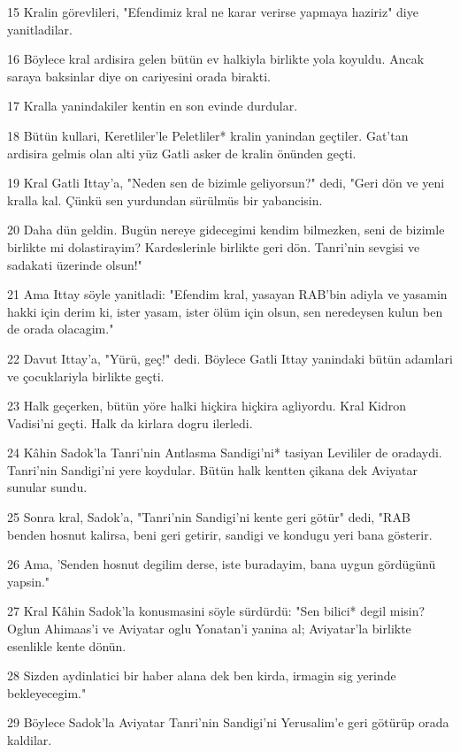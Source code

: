 \par 15 Kralin görevlileri, "Efendimiz kral ne karar verirse yapmaya haziriz" diye yanitladilar.
\par 16 Böylece kral ardisira gelen bütün ev halkiyla birlikte yola koyuldu. Ancak saraya baksinlar diye on cariyesini orada birakti.
\par 17 Kralla yanindakiler kentin en son evinde durdular.
\par 18 Bütün kullari, Keretliler'le Peletliler* kralin yanindan geçtiler. Gat'tan ardisira gelmis olan alti yüz Gatli asker de kralin önünden geçti.
\par 19 Kral Gatli Ittay'a, "Neden sen de bizimle geliyorsun?" dedi, "Geri dön ve yeni kralla kal. Çünkü sen yurdundan sürülmüs bir yabancisin.
\par 20 Daha dün geldin. Bugün nereye gidecegimi kendim bilmezken, seni de bizimle birlikte mi dolastirayim? Kardeslerinle birlikte geri dön. Tanri'nin sevgisi ve sadakati üzerinde olsun!"
\par 21 Ama Ittay söyle yanitladi: "Efendim kral, yasayan RAB'bin adiyla ve yasamin hakki için derim ki, ister yasam, ister ölüm için olsun, sen neredeysen kulun ben de orada olacagim."
\par 22 Davut Ittay'a, "Yürü, geç!" dedi. Böylece Gatli Ittay yanindaki bütün adamlari ve çocuklariyla birlikte geçti.
\par 23 Halk geçerken, bütün yöre halki hiçkira hiçkira agliyordu. Kral Kidron Vadisi'ni geçti. Halk da kirlara dogru ilerledi.
\par 24 Kâhin Sadok'la Tanri'nin Antlasma Sandigi'ni* tasiyan Levililer de oradaydi. Tanri'nin Sandigi'ni yere koydular. Bütün halk kentten çikana dek Aviyatar sunular sundu.
\par 25 Sonra kral, Sadok'a, "Tanri'nin Sandigi'ni kente geri götür" dedi, "RAB benden hosnut kalirsa, beni geri getirir, sandigi ve kondugu yeri bana gösterir.
\par 26 Ama, 'Senden hosnut degilim derse, iste buradayim, bana uygun gördügünü yapsin."
\par 27 Kral Kâhin Sadok'la konusmasini söyle sürdürdü: "Sen bilici* degil misin? Oglun Ahimaas'i ve Aviyatar oglu Yonatan'i yanina al; Aviyatar'la birlikte esenlikle kente dönün.
\par 28 Sizden aydinlatici bir haber alana dek ben kirda, irmagin sig yerinde bekleyecegim."
\par 29 Böylece Sadok'la Aviyatar Tanri'nin Sandigi'ni Yerusalim'e geri götürüp orada kaldilar.
